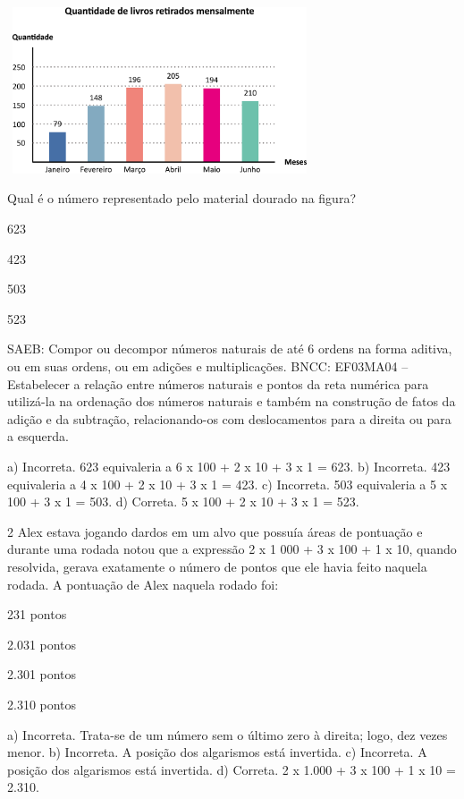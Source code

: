 \begin{escolha}
{\begin{escolha}
{\includegraphics[width=3.55128in,height=1.93600in]{media/image106.png}

Qual é o número representado pelo material dourado na figura?

\begin{escolha}
\item
  623
\item
  423
\item
  503
\item
  523
\end{escolha}

SAEB: Compor ou decompor números naturais de até 6 ordens na forma aditiva, ou em suas ordens, ou em adições e multiplicações.
BNCC: EF03MA04 -- Estabelecer a relação entre números naturais e pontos da reta numérica para
utilizá-la na ordenação dos números naturais e também na construção de fatos da adição e da
subtração, relacionando-os com deslocamentos para a direita ou para a esquerda.

a) Incorreta. 623 equivaleria a 6 x 100 + 2 x 10 + 3 x 1 = 623.
b) Incorreta. 423 equivaleria a 4 x 100 + 2 x 10 + 3 x 1 = 423.
c) Incorreta. 503 equivaleria a 5 x 100 + 3 x 1 = 503.
d) Correta. 5 x 100 + 2 x 10 + 3 x 1 = 523.

\num{2} Alex estava jogando dardos em um alvo que possuía áreas de pontuação e
durante uma rodada notou que a expressão 2 x 1 000 + 3 x 100 + 1 x 10,
quando resolvida, gerava exatamente o número de pontos que ele havia
feito naquela rodada. A pontuação de Alex naquela rodado foi:

\begin{escolha}
\item
  231 pontos
\item
  2.031 pontos
\item
  2.301 pontos
\item
  2.310 pontos
\end{escolha}

a) Incorreta. Trata-se de um número sem o último zero à direita; logo, dez vezes menor.
b) Incorreta. A posição dos algarismos está invertida.
c) Incorreta. A posição dos algarismos está invertida.
d) Correta. 2 x 1.000 + 3 x 100 + 1 x 10 = 2.310.


}
\end{escolha}}
\end{escolha}
